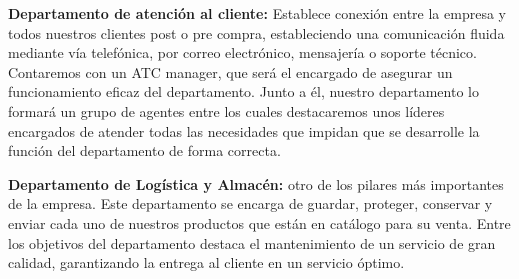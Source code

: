 \textbf{Departamento de atención al cliente:} Establece conexión entre la empresa y todos nuestros clientes post o pre compra, estableciendo una comunicación fluida mediante vía telefónica, por correo electrónico, mensajería o soporte técnico. Contaremos con un ATC manager, que será el encargado de asegurar un funcionamiento eficaz del departamento. Junto a él, nuestro departamento lo formará un grupo de agentes entre los cuales destacaremos unos líderes encargados de atender todas las necesidades que impidan que se desarrolle la función del departamento de forma correcta.

\textbf{Departamento de Logística y Almacén:} otro de los pilares más importantes de la empresa. Este departamento se encarga de guardar, proteger, conservar y enviar cada uno de nuestros productos que están en catálogo para su venta. Entre los objetivos del departamento destaca el mantenimiento de un servicio de gran calidad, garantizando la entrega al cliente en un servicio óptimo.
